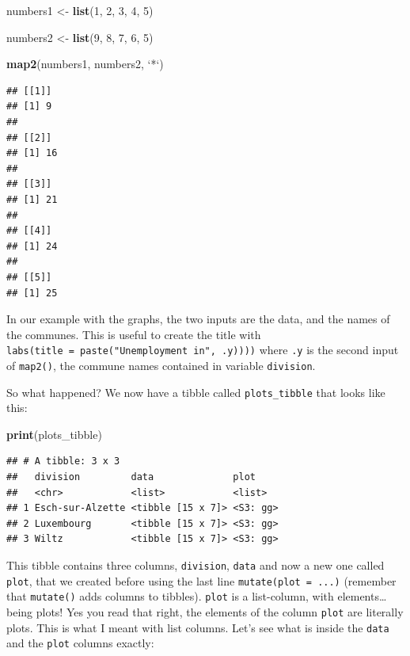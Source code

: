 \documentclass[]{gitbook}
\newenvironment{Shaded}{\begin{snugshade}}{\end{snugshade}}
\newcommand{\DataTypeTok}[1]{\textcolor[rgb]{0.13,0.29,0.53}{#1}}
\newcommand{\DecValTok}[1]{\textcolor[rgb]{0.00,0.00,0.81}{#1}}
\newcommand{\KeywordTok}[1]{\textcolor[rgb]{0.13,0.29,0.53}{\textbf{#1}}}
\newcommand{\NormalTok}[1]{#1}
\newcommand{\StringTok}[1]{\textcolor[rgb]{0.31,0.60,0.02}{#1}}
\begin{document}
\begin{Shaded}
\begin{Highlighting}[]
\NormalTok{numbers1 <-}\StringTok{ }\KeywordTok{list}\NormalTok{(}\DecValTok{1}\NormalTok{, }\DecValTok{2}\NormalTok{, }\DecValTok{3}\NormalTok{, }\DecValTok{4}\NormalTok{, }\DecValTok{5}\NormalTok{)}

\NormalTok{numbers2 <-}\StringTok{ }\KeywordTok{list}\NormalTok{(}\DecValTok{9}\NormalTok{, }\DecValTok{8}\NormalTok{, }\DecValTok{7}\NormalTok{, }\DecValTok{6}\NormalTok{, }\DecValTok{5}\NormalTok{)}

\KeywordTok{map2}\NormalTok{(numbers1, numbers2, }\StringTok{`}\DataTypeTok{*}\StringTok{`}\NormalTok{)}
\end{Highlighting}
\end{Shaded}

\begin{verbatim}
## [[1]]
## [1] 9
## 
## [[2]]
## [1] 16
## 
## [[3]]
## [1] 21
## 
## [[4]]
## [1] 24
## 
## [[5]]
## [1] 25
\end{verbatim}

In our example with the graphs, the two inputs are the data, and the names of the communes. This is
useful to create the title with \texttt{labs(title\ =\ paste("Unemployment\ in",\ .y))))} where \texttt{.y} is the
second input of \texttt{map2()}, the commune names contained in variable \texttt{division}.

So what happened? We now have a tibble called \texttt{plots\_tibble} that looks like this:

\begin{Shaded}
\begin{Highlighting}[]
\KeywordTok{print}\NormalTok{(plots_tibble)}
\end{Highlighting}
\end{Shaded}

\begin{verbatim}
## # A tibble: 3 x 3
##   division         data              plot    
##   <chr>            <list>            <list>  
## 1 Esch-sur-Alzette <tibble [15 x 7]> <S3: gg>
## 2 Luxembourg       <tibble [15 x 7]> <S3: gg>
## 3 Wiltz            <tibble [15 x 7]> <S3: gg>
\end{verbatim}

This tibble contains three columns, \texttt{division}, \texttt{data} and now a new one called \texttt{plot}, that we
created before using the last line \texttt{mutate(plot\ =\ ...)} (remember that \texttt{mutate()} adds columns to
tibbles). \texttt{plot} is a list-column, with elements\ldots{} being plots! Yes you read that right, the
elements of the column \texttt{plot} are literally plots. This is what I meant with list columns.
Let's see what is inside the \texttt{data} and the \texttt{plot} columns exactly:
\end{document}
